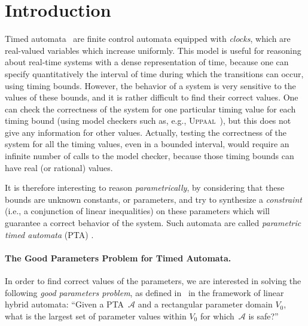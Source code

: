 \documentclass[a4paper,10pt]{article}
\newcommand{\A}{\mathcal{A}}
\newcommand{\imitator}{\textsc{Imitator}}
\newcommand{\uppaal}{\textsc{Uppaal}}
\newcommand{\imitatorversion}{2.3}
\newcommand{\paragraphe}[1]{\paragraph{#1.}}
\begin{document}
\lhead{\fancyplain{}{\imitator{} \imitatorversion{} User Manual}}


\section{Introduction}

Timed automata~\cite{ad94} are finite control automata equipped with {\em clocks}, which are real-valued variables which increase uniformly.
This model is useful for reasoning about real-time systems with a dense representation of time, because one can specify quantitatively the interval of time during which the transitions can occur, using timing bounds.
However, the behavior of a system is very sensitive to the values of these bounds, and it is rather difficult to find their correct values.
One can check the correctness of the system for one particular timing value for each timing bound (using model checkers such as, e.g., \uppaal{}~\cite{lpy97}), but this does not give any information for other values.
Actually, testing the correctness of the system for all the timing values, even in a bounded interval, would require an infinite number of calls to the model checker, because those timing bounds can have real (or rational) values.

It is therefore interesting to reason \emph{parametrically}, by considering that these bounds are unknown constants, or parameters, and try to synthesize a {\em constraint} (i.e., a conjunction of linear inequalities) on these parameters which will guarantee a correct behavior of the system.
Such automata are called \emph{parametric timed automata} (PTA) \cite{ahv93}. %

\paragraphe{The Good Parameters Problem for Timed Automata}
In order to find correct values of the parameters, we are interested in solving the following \emph{good parameters problem}, as defined in~\cite{fjk08} in the framework of linear hybrid automata:
``Given a PTA~$\A$ and a rectangular parameter domain $V_0$, what is the largest set of parameter values within $V_0$ for which~$\A$ is safe?''
\end{document}
